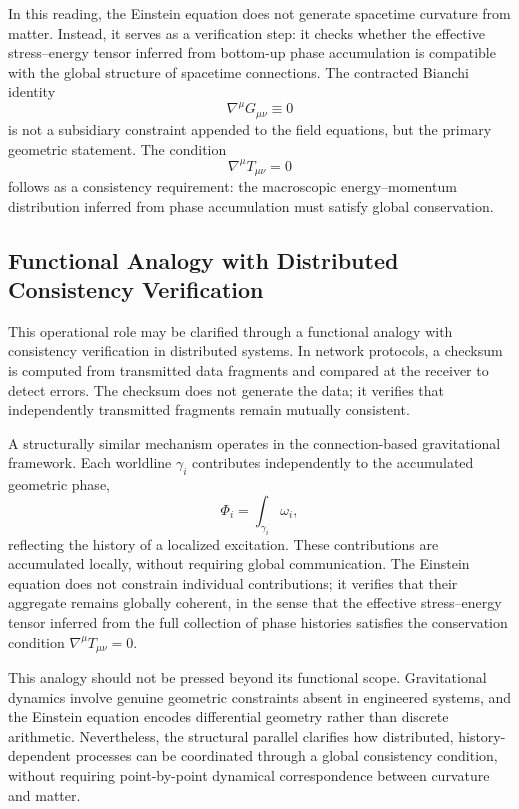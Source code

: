 \documentclass[%
 reprint,
 amsmath,amssymb,
 aps,
 prb,
]{revtex4-2}
\numberwithin{equation}{section}
\begin{document}
In this reading, the Einstein equation does not generate spacetime curvature from matter. Instead, it serves as a verification step: it checks whether the effective stress--energy tensor inferred from bottom-up phase accumulation is compatible with the global structure of spacetime connections. The contracted Bianchi identity
\begin{equation}
\nabla^\mu G_{\mu\nu} \equiv 0
\end{equation}
is not a subsidiary constraint appended to the field equations, but the primary geometric statement. The condition
\begin{equation}
\nabla^\mu T_{\mu\nu} = 0
\end{equation}
follows as a consistency requirement: the macroscopic energy--momentum distribution inferred from phase accumulation must satisfy global conservation.

\subsection{Functional Analogy with Distributed Consistency Verification}
\label{subsec:checksum_analogy}

This operational role may be clarified through a functional analogy with consistency verification in distributed systems. In network protocols, a checksum is computed from transmitted data fragments and compared at the receiver to detect errors. The checksum does not generate the data; it verifies that independently transmitted fragments remain mutually consistent.

A structurally similar mechanism operates in the connection-based gravitational framework. Each worldline $\gamma_i$ contributes independently to the accumulated geometric phase,
\begin{equation}
\Phi_i = \int_{\gamma_i} \omega_i,
\end{equation}
reflecting the history of a localized excitation. These contributions are accumulated locally, without requiring global communication. The Einstein equation does not constrain individual contributions; it verifies that their aggregate remains globally coherent, in the sense that the effective stress--energy tensor inferred from the full collection of phase histories satisfies the conservation condition $\nabla^\mu T_{\mu\nu} = 0$.

This analogy should not be pressed beyond its functional scope. Gravitational dynamics involve genuine geometric constraints absent in engineered systems, and the Einstein equation encodes differential geometry rather than discrete arithmetic. Nevertheless, the structural parallel clarifies how distributed, history-dependent processes can be coordinated through a global consistency condition, without requiring point-by-point dynamical correspondence between curvature and matter.
\end{document}
